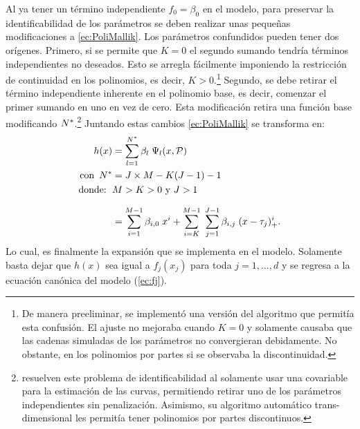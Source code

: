 \documentclass[../Main/Main.tex]{subfiles}
\begin{document}
Al ya tener un término independiente $f_0 = \beta_0$ en el modelo, para preservar la identificabilidad de los parámetros se deben realizar unas pequeñas modificaciones a \eqref{ec:PoliMallik}. Los parámetros confundidos pueden tener dos orígenes. Primero, si se permite que $K = 0$ el segundo sumando tendría términos independientes no deseados. Esto se arregla fácilmente imponiendo la restricción de continuidad en los polinomios, es decir, $K > 0$.\footnote{De manera preeliminar, se implementó una versión del algoritmo que permitía esta confusión. El ajuste no mejoraba cuando $K = 0$ y solamente causaba que las cadenas simuladas de los parámetros no convergieran debidamente. No obstante, en los polinomios por partes si se observaba la discontinuidad.} Segundo, se debe retirar el término independiente inherente en el polinomio base, es decir, comenzar el primer sumando en uno en vez de cero. Esta modificación retira una función base modificando $N^*$.\footnote{\citeauthor{mallik1998automatic} resuelven este problema de identificabilidad al solamente usar una covariable para la estimación de las curvas, permitiendo retirar uno de los parámetros independientes sin penalización. Asimismo, su algoritmo automático trans-dimensional les permitía tener polinomios por partes discontinuos.} Juntando estas cambios \eqref{ec:PoliMallik} se transforma en:
\begin{align}
	h(x) &= \sum_{l = 1}^{N^*} \beta_l \; \Psi_l(x,\mathcal{P}) \nonumber\\ 
	\text{con } \, N^* &= J\times M - K(J-1) - 1\nonumber \\
	\text{donde: } \, & M > K > 0 \text{ y } J > 1 \nonumber \\[7pt]
 		 &=	\sum_{i = 1}^{M - 1} \beta_{i,0} \; x^{i} + 
		\sum_{i = K}^{M-1} \;
	 		\sum_{j = 1}^{J-1}\beta_{i,j}\;(x - \tau_j)_+^{i}.
	 			\label{ec:PoliFinal}
\end{align}
Lo cual, es finalmente la expansión que se implementa en el modelo. Solamente basta dejar que $h(x)$ sea igual a $f_j(x_j)$ para toda $j = 1,\ldots,d$ y se regresa a la ecuación canónica del modelo (\ref{ec:fj}).
\end{document}

